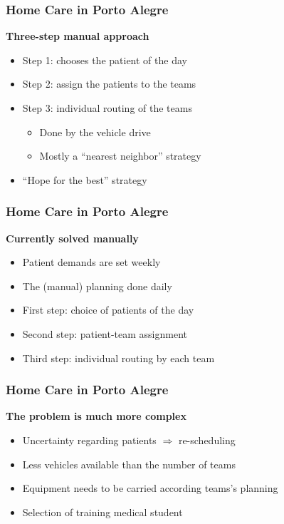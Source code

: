 \begin{frame}
   \frametitle{Home Care in Porto Alegre}


   \textbf{Three-step manual approach}
   \begin{itemize}
      \item Step 1: chooses the patient of the day
      \item Step 2: assign the patients to the teams
      \item Step 3: individual routing of the teams
      \begin{itemize}
         \item Done by the vehicle drive
         \item Mostly a ``nearest neighbor'' strategy
      \end{itemize}
      \item ``Hope for the best'' strategy
   \end{itemize}

\end{frame}

\begin{frame}
   \frametitle{Home Care in Porto Alegre}

   \vspace*{8pt}

   \textbf{Currently solved manually}
   \begin{itemize}
      \item Patient demands are set weekly
      \item The (manual) planning done daily
      \item First step: choice of patients of the day
      \item Second step: patient-team assignment
      \item Third step: individual routing by each team
   \end{itemize}

\end{frame}

\begin{frame}
   \frametitle{Home Care in Porto Alegre}

   \textbf{The problem is much more complex}
   \begin{itemize}
      \item Uncertainty regarding patients $\Rightarrow$ re-scheduling
      \item Less vehicles available than the number of teams
      \item Equipment needs to be carried according teams's planning
      \item Selection of training medical student
   \end{itemize}
\end{frame}

